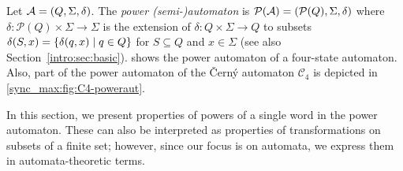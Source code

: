 
\label{def:power_aut} 
Let $\mathcal A = (Q, \Sigma, \delta)$. The \emph{power (semi-)automaton} 
is $\mathcal P({\mathcal A}) = (\mathcal P(Q), \Sigma, \delta)$
where $\delta \colon \mathcal P(Q)\times \Sigma \to \Sigma$ is the extension of
$\delta \colon Q \times \Sigma \to Q$ to subsets $\delta(S,x) = \{ \delta(q,x) \mid q \in Q \}$ 
for $S \subseteq Q$ and $x \in \Sigma$ (see also Section~\ref{intro:sec:basic}).
 shows the power automaton
of a four-state automaton. Also, part of the power 
automaton of the \v{C}ern\'y automaton $\mathcal C_4$
is depicted in \cref{sync_max:fig:C4-poweraut}.

In this section, we present properties of powers of a single word in the power automaton. These can also be interpreted as properties of transformations on subsets of a finite set; however, since our focus is on automata, we express them in automata-theoretic terms.





